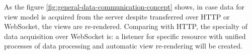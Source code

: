 As the figure \ref{fig:general-data-communication-concept} shows, in case data for view model is acquired from the server despite transferred over HTTP or WebSocket, the views are re-rendered. Comparing with HTTP, the specialty of data acquisition over WebSocket is: a listener for specific resource with unified processes of data processing and automatic view re-rendering will be created.